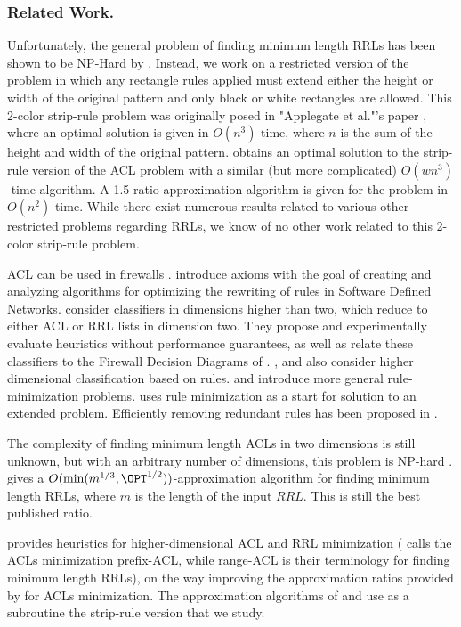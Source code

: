 \subsubsection{Related Work.}
Unfortunately, the general problem of finding minimum length RRLs has been shown to be NP-Hard by \cite{ACJKLW07}.
Instead, we work on a restricted version of the problem in which any rectangle rules applied must extend either the height or width of the original pattern and only black or white rectangles are allowed.
This 2-color strip-rule problem was originally posed in "Applegate et al."'s paper
\cite{ACJKLW07}, where an optimal solution is given in $O(n^3)$-time, where $n$ is the sum of the height and width of the original pattern.
\cite{ACJKLW07} obtains an optimal solution to the strip-rule version of the
ACL problem with a similar (but more complicated) $O(w n^3)$-time algorithm.
A 1.5 ratio approximation algorithm is given for the problem in $O(n^2)$-time.
While there exist numerous results related to various other restricted problems regarding RRLs, we know of no other work related to this 2-color strip-rule problem.

ACL can be used in firewalls \cite{KRRW12}.
\cite{KRRW12b} introduce axioms with the goal of
creating and analyzing algorithms for optimizing the rewriting of rules
in Software Defined Networks.
\cite{LMT10} consider classifiers in dimensions higher than two,
which reduce to either ACL or RRL lists in dimension two. They propose
and experimentally evaluate heuristics without performance guarantees,
as well as relate these classifiers to the Firewall Decision Diagrams of
\cite{GL07}.
\cite{PL14}, and \cite{CDG16}  also consider higher dimensional classification based on rules.
\cite{KLRW13} and \cite{ZNHBM14} introduce more general rule-minimization problems.
\cite{SK10} uses rule minimization as a start for solution to an
extended problem. Efficiently
removing redundant rules has been proposed in \cite{SK10b}.

The complexity of finding minimum length ACLs in two dimensions
is still unknown, but with an arbitrary
number of dimensions, this problem is NP-hard \cite{KNCER13}.
\cite{ACJKLW07} gives a $O(\min(m^{1/3},\OPT^{1/2}))$-approximation
algorithm for finding minimum length RRLs, where $m$ is the length
of the input $RRL$. This is still the best published ratio.

\cite{DLT16} provides heuristics for higher-dimensional ACL and RRL
minimization
(\cite{DLT16} calls the ACLs minimization prefix-ACL, while
range-ACL is their terminology for finding minimum length RRLs),
on the way improving the approximation ratios provided by
 \cite{ACJKLW07} for ACLs minimization.  The approximation
algorithms of \cite{DLT16}  and \cite{ACJKLW07} use
as a subroutine the strip-rule version that we study.


